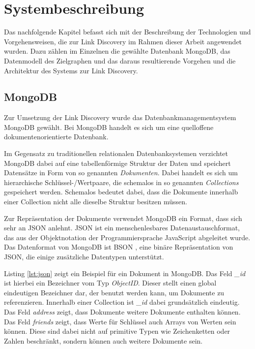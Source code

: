 \chapter{Systembeschreibung}

Das nachfolgende Kapitel befasst sich mit der Beschreibung der Technologien und Vorgehensweisen, die zur Link Discovery im Rahmen dieser Arbeit angewendet wurden. Dazu zählen im Einzelnen die gewählte Datenbank MongoDB, das Datenmodell des Zielgraphen und das daraus resultierende Vorgehen und die Architektur des Systems zur Link Discovery.

\section{MongoDB}

Zur Umsetzung der Link Discovery wurde das Datenbankmanagementsystem MongoDB \cite{mo2013} gewählt. Bei MongoDB handelt es sich um eine quelloffene dokumentenorientierte Datenbank.

Im Gegensatz zu traditionellen relationalen Datenbanksystemen verzichtet MongoDB dabei auf eine tabellenförmige Struktur der Daten und speichert Datensätze in Form von so genannten \emph{Dokumenten}. Dabei handelt es sich um hierarchische Schlüssel-/Wertpaare, die schemalos in so genannten \emph{Collections} gespeichert werden. Schemalos bedeutet dabei, dass die Dokumente innerhalb einer Collection nicht alle dieselbe Struktur besitzen müssen.

Zur Repräsentation der Dokumente verwendet MongoDB ein Format, dass sich sehr an JSON \cite{json2006} anlehnt. JSON ist ein menschenlesbares Datenaustauschformat, das aus der Objektnotation der Programmiersprache JavaScript abgeleitet wurde. Das Datenformat von MongoDB ist BSON \cite{bson2013}, eine binäre Repräsentation von JSON, die einige zusätzliche Datentypen unterstützt. 

Listing \ref{lst:json} zeigt ein Beispiel für ein Dokument in MongoDB. Das Feld \emph{\_id} ist hierbei ein  Bezeichner vom Typ \emph{ObjectID}. Dieser stellt einen global eindeutigen Bezeichner dar, der benutzt werden kann, um Dokumente zu referenzieren. Innerhalb einer Collection ist \emph{\_id} dabei grundsätzlich eindeutig. Das Feld \emph{address} zeigt, dass Dokumente weitere Dokumente enthalten können. Das Feld \emph{friends} zeigt, dass Werte für Schlüssel auch Arrays von Werten sein können. Diese sind dabei nicht auf primitive Typen wie Zeichenketten oder Zahlen beschränkt, sondern können auch weitere Dokumente sein.

